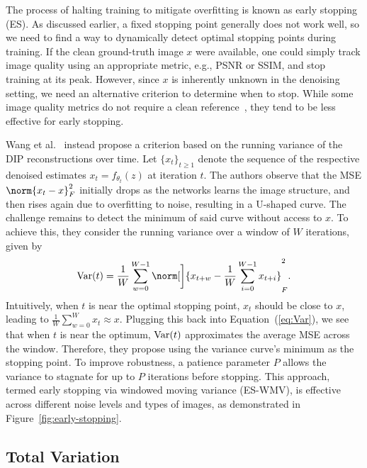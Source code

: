 The process of halting training to mitigate overfitting is known as early stopping (ES).
As discussed earlier, a fixed stopping point generally does not work well, so we need to find a way to dynamically detect optimal stopping points during training.
If the clean ground-truth image $x$ were available, one could simply track image quality using an appropriate metric, e.g., PSNR or SSIM, and stop training at its peak.
However, since $x$ is inherently unknown in the denoising setting, we need an alternative criterion to determine when to stop.
While some image quality metrics do not require a clean reference~\cite{BRISQUE}, they tend to be less effective for early stopping.

Wang et al.~\cite{ES} instead propose a criterion based on the running variance of the DIP reconstructions over time.
Let $\{x_t\}_{t \geq 1}$ denote the sequence of the respective denoised estimates $x_t = f_{\theta_t}(z)$ at iteration $t$.
The authors observe that the MSE $\norm{x_t-x}_F^2$ initially drops as the networks learns the image structure, and then rises again due to overfitting to noise, resulting in a U-shaped curve.
The challenge remains to detect the minimum of said curve without access to $x$.
To achieve this, they consider the running variance over a window of $W$ iterations, given by
\begin{equation}\label{eq:Var}
    \Var(t) = \frac{1}{W} \sum_{w=0}^{W-1} \norm[\bigg]{x_{t+w}-\frac{1}{W} \sum_{i=0}^{W-1} x_{t+i}}_F^2.
\end{equation}
Intuitively, when $t$ is near the optimal stopping point, $x_t$ should be close to $x$, leading to $\frac{1}{W} \sum_{w=0}^{W} x_t \approx x$.
Plugging this back into Equation~(\ref{eq:Var}), we see that when $t$ is near the optimum, $\operatorname{Var}(t)$ approximates the average MSE across the window.
Therefore, they propose using the variance curve's minimum as the stopping point.
To improve robustness, a patience parameter $P$ allows the variance to stagnate for up to $P$ iterations before stopping.
This approach, termed early stopping via windowed moving variance (ES-WMV), is effective across different noise levels and types of images, as demonstrated in Figure~\ref{fig:early-stopping}. 

\subsection{Total Variation}

